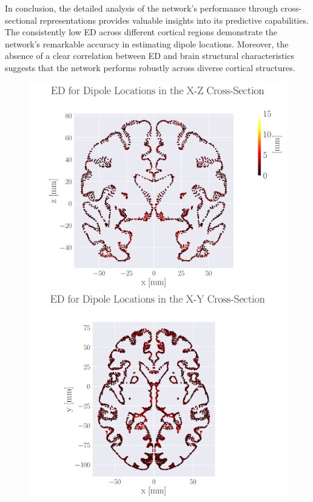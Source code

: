 \documentclass[a4paper, UKenglish, 11pt]{uiomaster}
\begin{document}
In conclusion, the detailed analysis of the network's performance through cross-sectional representations provides valuable insights into its predictive capabilities. The consistently low ED across different cortical regions demonstrate the network's remarkable accuracy in estimating dipole locations. Moreover, the absence of a clear correlation between ED and brain structural characteristics suggests that the network performs robustly across diverse cortical structures.


\begin{figure}[!htb]
    \centering
    \includegraphics[width=0.7\linewidth]{figures/Simple/MED_simple_dipole_error_Euclidean Distance_0.pdf}
    \vspace{10pt} %
    \includegraphics[width=0.7\linewidth]{figures/simple/MED_simple_dipole_error_Euclidean Distance_1.pdf}

\end{figure}
\end{document}
